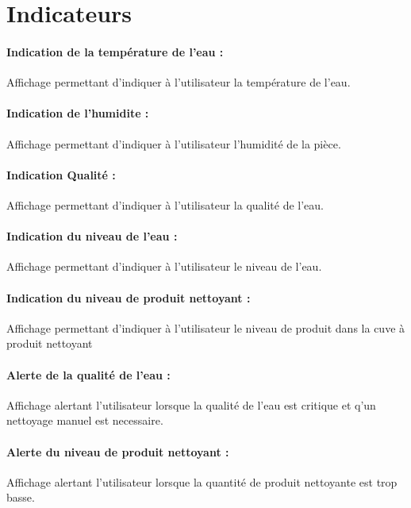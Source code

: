 \documentclass[a4paper,11pt]{article}
\begin{document}
\section{Indicateurs}


    \paragraph{Indication de la température de l'eau :}
        Affichage permettant d'indiquer à l'utilisateur la température de l'eau. 

    \paragraph{Indication de l'humidite :}
        Affichage permettant d'indiquer à l'utilisateur l'humidité de la pièce.

    \paragraph{Indication Qualité :}
	    Affichage permettant d'indiquer à l'utilisateur la qualité de l'eau.

    \paragraph{Indication du niveau de l'eau :}
	    Affichage permettant d'indiquer à l'utilisateur le niveau de l'eau.

    \paragraph{Indication du niveau de produit nettoyant :}
	    Affichage permettant d'indiquer à l'utilisateur le niveau de produit dans la cuve à produit nettoyant

    \paragraph{Alerte de la qualité de l'eau :}
	    Affichage alertant l'utilisateur lorsque la qualité de l'eau est critique et q'un nettoyage manuel est necessaire.

    \paragraph{Alerte du niveau de produit nettoyant :}
	    Affichage alertant l'utilisateur lorsque la quantité de produit nettoyante est trop basse.
\end{document}

